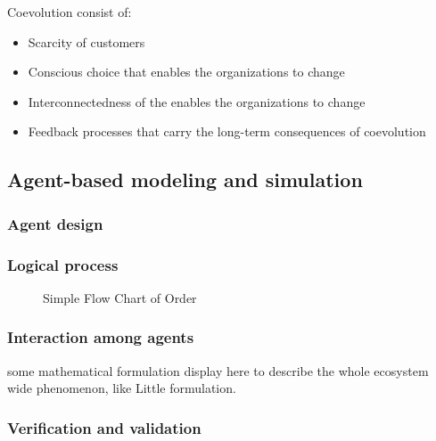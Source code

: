 Coevolution consist of:
\begin{itemize}
	\item Scarcity of customers
	\item Conscious choice that enables the organizations to change
	\item Interconnectedness of the enables the organizations to change
	\item Feedback processes that carry the long-term consequences of coevolution
\end{itemize}





\subsection{Agent-based modeling and simulation} %
\label{sub:agent_based_modeling_and_simulation}
\subsubsection{Agent design}

\subsubsection{Logical process}
\begin{figure}[htbp]
\centering\small
{} \hspace{0.09\textwidth}
\caption{Simple Flow Chart of Order}
\end{figure}

\subsubsection{Interaction among agents}
some mathematical formulation display here to describe the whole ecosystem wide phenomenon, like Little formulation.

\subsubsection{Verification and validation}
